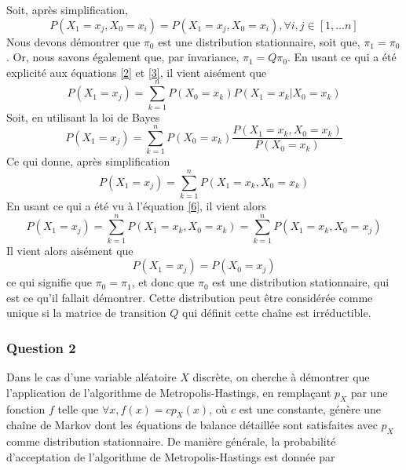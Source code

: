 \documentclass[a4paper, 11pt]{article}
\begin{document}
Soit, après simplification, 
\begin{equation}
    P(X_1=x_j,X_0=x_i)=P(X_1=x_j,X_0=x_i), \forall i,j \in [1,...n]
    \label{6}
\end{equation}
Nous devons démontrer que $\pi_0$ est une distribution stationnaire, soit que, $\pi_1=\pi_0$. Or, nous savons également que, par invariance, $\pi_1=Q\pi_0$. En usant ce qui a été explicité aux équations \ref{2} et \ref{3}, il vient aisément que
\begin{equation}
    P(X_1=x_j)=\sum^n_{k=1} P(X_0=x_k)P(X_1=x_k|X_0=x_k)
\end{equation}
Soit, en utilisant la loi de Bayes
\begin{equation}
    P(X_1=x_j)=\sum^n_{k=1} P(X_0=x_k)\frac{P(X_1=x_k,X_0=x_k)}{P(X_0=x_k)}
\end{equation}
Ce qui donne, après simplification
\begin{equation}
    P(X_1=x_j)=\sum^n_{k=1}P(X_1=x_k,X_0=x_k)
\end{equation}
En usant ce qui a été vu à l'équation \ref{6}, il vient alors
\begin{equation}
    P(X_1=x_j)=\sum^n_{k=1}P(X_1=x_k,X_0=x_k)=\sum^n_{k=1}P(X_1=x_k,X_0=x_j)
\end{equation}
Il vient alors aisément que
\begin{equation}
    P(X_1=x_j)=P(X_0=x_j)
\end{equation}
ce qui signifie que $\pi_0=\pi_1$, et donc que $\pi_0$ est une distribution stationnaire, qui est ce qu'il fallait démontrer. Cette distribution peut être considérée comme unique si la matrice de transition $Q$ qui définit cette chaîne est irréductible.
\subsubsection{Question 2}\label{Q122}
Dans le cas d'une variable aléatoire $X$ discrète, on cherche à démontrer que l'application de l'algorithme de Metropolis-Hastings, en remplaçant $p_X$ par une fonction $f$ telle que $\forall x, f(x)=cp_X (x)$, où $c$ est une constante, génère une chaîne de Markov dont les équations de balance détaillée sont satisfaites avec $p_X$ comme distribution stationnaire. De manière générale, la probabilité d'acceptation de l'algorithme de Metropolis-Hastings est donnée par
\end{document}
